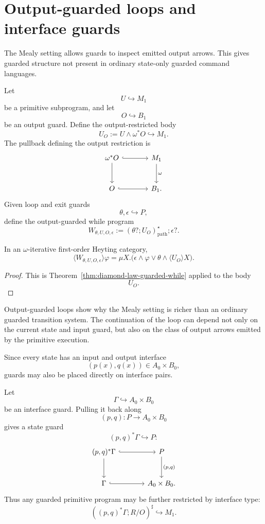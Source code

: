 \section{Output-guarded loops and interface guards}
\label{sec:output-guarded-loops-interface-guards}

The Mealy setting allows guards to inspect emitted output arrows. This
gives guarded structure not present in ordinary state-only guarded command
languages.

Let
\[
U\hookrightarrow M_1
\]
be a primitive subprogram, and let
\[
O\hookrightarrow B_1
\]
be an output guard. Define the output-restricted body
\[
U_O:=U\wedge \omega^\ast O\hookrightarrow M_1.
\]
The pullback defining the output restriction is
\[
\begin{tikzcd}[column sep=large,row sep=large]
\omega^\ast O
  \arrow[r, hook]
  \arrow[d]
&
M_1
  \arrow[d, "\omega"]
\\
O
  \arrow[r, hook]
&
B_1 .
\end{tikzcd}
\]
Given loop and exit guards
\[
\theta,\epsilon\hookrightarrow P,
\]
define the output-guarded while program
\[
W_{\theta,U,O,\epsilon}
:=
(\theta?;U_O)^\star_{\mathrm{path}};\epsilon?.
\]

\begin{proposition}
\label{prop:output-guarded-loop-diamond}
In an \(\omega\)-iterative first-order Heyting category,
\[
\langle W_{\theta,U,O,\epsilon}\rangle\varphi
=
\mu X.\bigl(
\epsilon\wedge\varphi
\vee
\theta\wedge\langle U_O\rangle X
\bigr).
\]
\end{proposition}

\begin{proof}
This is Theorem~\ref{thm:diamond-law-guarded-while} applied to the body
\[
U_O.
\]
\end{proof}

\begin{remark}
\label{rem:output-guarded-loop}
Output-guarded loops show why the Mealy setting is richer than an ordinary
guarded transition system. The continuation of the loop can depend not
only on the current state and input guard, but also on the class of output
arrows emitted by the primitive execution.
\end{remark}

Since every state has an input and output interface
\[
(p(x),q(x))\in A_0\times B_0,
\]
guards may also be placed directly on interface pairs.

Let
\[
\Gamma\hookrightarrow A_0\times B_0
\]
be an interface guard. Pulling it back along
\[
(p,q):P\to A_0\times B_0
\]
gives a state guard
\[
(p,q)^\ast\Gamma\hookrightarrow P:
\]
\[
\begin{tikzcd}[column sep=large,row sep=large]
(p,q)^\ast\Gamma
  \arrow[r, hook]
  \arrow[d]
&
P
  \arrow[d, "{(p,q)}"]
\\
\Gamma
  \arrow[r, hook]
&
A_0\times B_0 .
\end{tikzcd}
\]
Thus any guarded primitive program may be further restricted by interface
type:
\[
((p,q)^\ast\Gamma;R/O)^\sharp\hookrightarrow M_1.
\]

